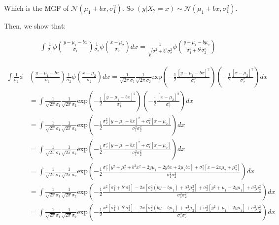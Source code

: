 \documentclass[11pt]{article}
\begin{document}
Which is the MGF of $\mathcal{N}(\mu_1 + bx, \sigma^2_1)$. So $(y|X_2=x) \sim \mathcal{N}(\mu_1 + bx, \sigma^2_1) $.

Then, we show that:

\begin{align*}
    \int \frac{1}{\sigma_1} \phi \left( \frac{y-\mu_1-bx}{\sigma_1}\right)  \frac{1}{\sigma_2} \phi \left( \frac{x-\mu_2}{\sigma_2}\right)dx = \frac{1}{\sqrt{\sigma^2_1+b^2\sigma^2_2}} \phi \left( \frac{y-\mu_1-b\mu_2}{{\sigma^2_1+b^2\sigma^2_2}}\right)
\end{align*}


\begin{align*}
    \int \frac{1}{\sigma_1}  \phi & \left( \frac{y-\mu_1-bx}{\sigma_1}\right)  \frac{1}{\sigma_2} \phi \left( \frac{x-\mu_2}{\sigma_2}\right)dx = \frac{1}{\sqrt{2\pi}\sigma_1} \frac{1}{\sqrt{2\pi}\sigma_2} \text{exp}\left(-\frac{1}{2}\frac{[y-\mu_1-bx]^2}{\sigma^2_1}\right)\left(-\frac{1}{2}\frac{[x-\mu_2]^2}{\sigma_2^2}\right)dx\\
    &= \int\frac{1}{\sqrt{2\pi}\sigma_1} \frac{1}{\sqrt{2\pi}\sigma_2} \text{exp}\left(-\frac{1}{2}\frac{[y-\mu_1-bx]^2}{\sigma^2_1}\right)\left(-\frac{1}{2}\frac{[x-\mu_2]^2}{\sigma_2^2}\right)dx\\
     &= \int\frac{1}{\sqrt{2\pi}\sigma_1} \frac{1}{\sqrt{2\pi}\sigma_2} \text{exp}\left(-\frac{1}{2}\frac{\sigma^2_2[y-\mu_1-bx]^2+\sigma^2_1[x-\mu_2]}{\sigma^2_1\sigma^2_2}\right)dx\\
      &= \int\frac{1}{\sqrt{2\pi}\sigma_1} \frac{1}{\sqrt{2\pi}\sigma_2} \text{exp}\left(-\frac{1}{2}\frac{\sigma^2_2[y-\mu_1-bx]^2+\sigma^2_1[x-\mu_2]}{\sigma^2_1\sigma^2_2}\right)dx\\
      &= \int\frac{1}{\sqrt{2\pi}\sigma_1} \frac{1}{\sqrt{2\pi}\sigma_2} \text{exp}\left(-\frac{1}{2}\frac{\sigma^2_2[y^2 + \mu_1^2 + b^2x^2 - 2y\mu_1 - 2ybx + 2\mu_1bx]+\sigma^2_1[x-2x\mu_2 + \mu_2^2]}{\sigma^2_1\sigma^2_2}\right)dx\\
      & = \int\frac{1}{\sqrt{2\pi}\sigma_1} \frac{1}{\sqrt{2\pi}\sigma_2} \text{exp}\left(-\frac{1}{2}\frac{x^2[\sigma^2_1+b^2\sigma^2_2]-2x[\sigma^2_2(by-b\mu_1)+\sigma^2_1\mu^2_2] + \sigma^2_2[y^2+\mu_1-2y\mu_1]+\sigma^2_1\mu^2_2}{\sigma^2_1\sigma^2_2}\right)dx\\
         & = \int\frac{1}{\sqrt{2\pi}\sigma_1} \frac{1}{\sqrt{2\pi}\sigma_2} \text{exp}\left(-\frac{1}{2}\frac{x^2[\sigma^2_1+b^2\sigma^2_2]-2x[\sigma^2_2(by-b\mu_1)+\sigma^2_1\mu_2] + \sigma^2_2[y^2+\mu_1-2y\mu_1]+\sigma^2_1\mu_2^2}{\sigma^2_1\sigma^2_2}\right)dx
\end{align*}
\end{document}
